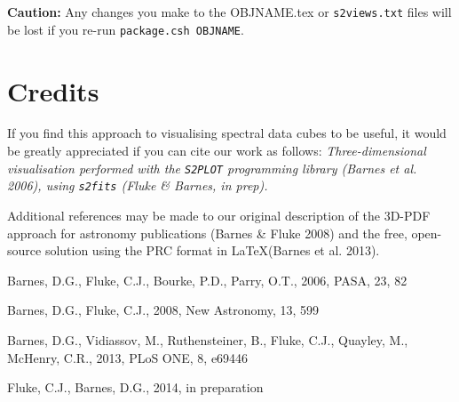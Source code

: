 \documentclass{article}
\begin{document}
{\bf Caution:} Any changes you make to the OBJNAME.tex or {\tt s2views.txt} 
files will be lost if you re-run {\tt package.csh OBJNAME}.


\section*{Credits}
If you find this approach to visualising spectral data cubes to be useful, 
it would be greatly appreciated if you can cite our work as follows:
{\em Three-dimensional visualisation performed with the {\tt S2PLOT} programming 
library (Barnes et al. 2006), using {\tt s2fits} (Fluke \& Barnes, {\em in prep}).}

Additional references may be made to our original description of the 3D-PDF approach
for astronomy publications (Barnes \& Fluke 2008) and the free, open-source solution 
using the PRC format in \LaTeX (Barnes et al. 2013). 


\begin{thebibliography}{99}
Barnes, D.G., Fluke, C.J., Bourke, P.D., Parry, O.T., 2006, PASA, 23, 82

Barnes, D.G., Fluke, C.J., 2008, New Astronomy, 13, 599 

Barnes, D.G., Vidiassov, M., Ruthensteiner, B., Fluke, C.J., Quayley, M., McHenry, C.R., 2013, PLoS ONE, 8, e69446

Fluke, C.J., Barnes, D.G., 2014, in preparation

\end{thebibliography}
\end{document}
